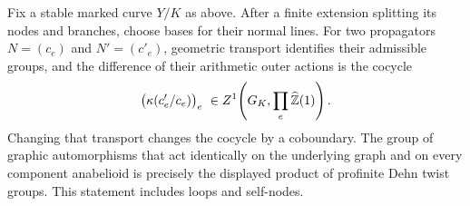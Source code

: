 \begin{lemma}\label{A6-normal-kummer}
Fix a stable marked curve $Y/K$ as above. After a finite extension splitting its nodes and branches, choose bases for their normal lines. For two propagators $N=(c_e)$ and $N'=(c'_e)$, geometric transport identifies their admissible groups, and the difference of their arithmetic outer actions is the cocycle
\[
 \bigl(\kappa(c'_e/c_e)\bigr)_e
 \ \in Z^1\!\left(G_K,\prod_e\widehat{{\mathbb{Z}}}(1)\right).
\]
Changing that transport changes the cocycle by a coboundary. The group of graphic automorphisms that act identically on the underlying graph and on every component anabelioid is precisely the displayed product of profinite Dehn twist groups. This statement includes loops and self-nodes.
\end{lemma}
